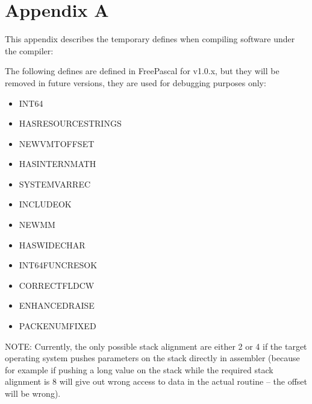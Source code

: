 \documentclass [a4paper,12pt]{article}
\begin{document}
\section{Appendix A}
\label{sec:appendix}

This appendix describes the temporary defines when compiling software under
the compiler:

The following defines are defined in FreePascal for v1.0.x, but they will be
removed in future versions, they are used for debugging purposes only:

\begin{itemize}
\item INT64
\item HASRESOURCESTRINGS
\item NEWVMTOFFSET
\item HASINTERNMATH
\item SYSTEMVARREC
\item INCLUDEOK
\item NEWMM
\item HASWIDECHAR
\item INT64FUNCRESOK
\item CORRECTFLDCW
\item ENHANCEDRAISE
\item PACKENUMFIXED
\end{itemize}

NOTE: Currently, the only possible stack alignment are either 2 or 4 if the
target operating system pushes parameters on the stack directly in assembler
(because for example if pushing a long value on the stack while the required
stack alignment is 8 will give out wrong access to data in the actual
routine -- the offset will be wrong).

\printindex
\end{document}
